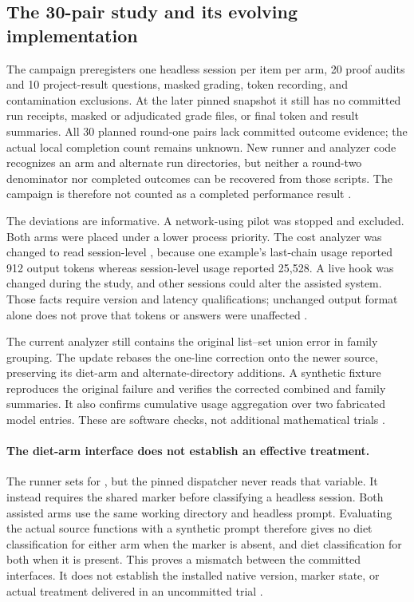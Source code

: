 \subsection{The 30-pair study and its evolving implementation}

The campaign preregisters one headless session per item per arm, 20 proof audits and 10 project-result questions, masked grading, token recording, and contamination exclusions. At the later pinned snapshot it still has no committed run receipts, masked or adjudicated grade files, or final token and result summaries. All 30 planned round-one pairs lack committed outcome evidence; the actual local completion count remains unknown. New runner and analyzer code recognizes an  arm and alternate run directories, but neither a round-two denominator nor completed outcomes can be recovered from those scripts. The campaign is therefore not counted as a completed performance result \citep{benchmark_update_ab30_directory,benchmark_update_ab30_readme,benchmark_update_ab30_prereg,benchmark_update_ab30_runner,benchmark_update_ab30_analyzer}.

The deviations are informative. A network-using pilot was stopped and excluded. Both arms were placed under a lower process priority. The cost analyzer was changed to read session-level , because one example's last-chain usage reported 912 output tokens whereas session-level usage reported 25,528. A live hook was changed during the study, and other sessions could alter the assisted system. Those facts require version and latency qualifications; unchanged output format alone does not prove that tokens or answers were unaffected \citep{ab30deviation}.

The current analyzer still contains the original list--set union error in family grouping. The update rebases the one-line correction onto the newer source, preserving its diet-arm and alternate-directory additions. A synthetic fixture reproduces the original failure and verifies the corrected combined and family summaries. It also confirms cumulative usage aggregation over two fabricated model entries. These are software checks, not additional mathematical trials \citep{benchmark_update_ab30_analyzer}.

\paragraph{The diet-arm interface does not establish an effective treatment.}
The runner sets  for , but the pinned dispatcher never reads that variable. It instead requires the shared  marker before classifying a headless session. Both assisted arms use the same working directory and headless prompt. Evaluating the actual source functions with a synthetic prompt therefore gives no diet classification for either arm when the marker is absent, and diet classification for both when it is present. This proves a mismatch between the committed interfaces. It does not establish the installed native version, marker state, or actual treatment delivered in an uncommitted trial \citep{benchmark_update_ab30_runner,dispatcher20260923}.

